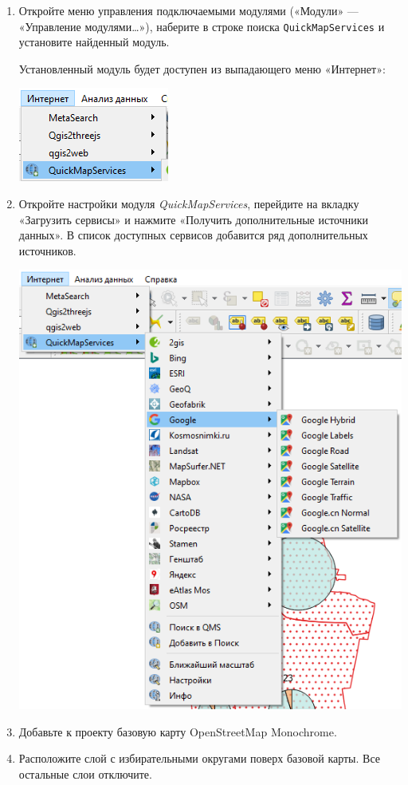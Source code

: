\documentclass[
  12pt,
]{book}
\begin{document}
\begin{enumerate}
\def\labelenumi{\arabic{enumi}.}
\item
  Откройте меню управления подключаемыми модулями («Модули» --- «Управление модулями\ldots»), наберите в строке поиска \texttt{QuickMapServices} и установите найденный модуль.

  Установленный модуль будет доступен из выпадающего меню «Интернет»:

  \includegraphics{images/Ex05/qms1.png}
\item
  Откройте настройки модуля \emph{QuickMapServices}, перейдите на вкладку «Загрузить сервисы» и нажмите «Получить дополнительные источники данных». В список доступных сервисов добавится ряд дополнительных источников.

  \includegraphics{images/Ex05/qms2.png}
\item
  Добавьте к проекту базовую карту OpenStreetMap Monochrome.
\item
  Расположите слой с избирательными округами поверх базовой карты. Все остальные слои отключите.
\end{enumerate}
\end{document}
